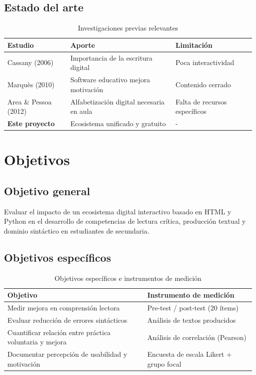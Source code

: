 \documentclass[12pt,spanish]{article}
\begin{document}
\subsection{Estado del arte}

\begin{table}[H]
\centering
\caption{Investigaciones previas relevantes}
\label{tab:estado_arte}
\begin{tabular}{|p{3.5cm}|p{5cm}|p{5cm}|}
\hline
\textbf{Estudio} & \textbf{Aporte} & \textbf{Limitación} \\
\hline
Cassany (2006) & Importancia de la escritura digital & Poca interactividad \\
\hline
Marquès (2010) & Software educativo mejora motivación & Contenido cerrado \\
\hline
Area \& Pessoa (2012) & Alfabetización digital necesaria en aula & Falta de recursos específicos \\
\hline
\textbf{Este proyecto} & Ecosistema unificado y gratuito & - \\
\hline
\end{tabular}
\end{table}

\newpage
\section{Objetivos}

\subsection{Objetivo general}

Evaluar el impacto de un ecosistema digital interactivo basado en HTML y Python en el desarrollo de competencias de lectura crítica, producción textual y dominio sintáctico en estudiantes de secundaria.

\subsection{Objetivos específicos}

\begin{table}[H]
\centering
\caption{Objetivos específicos e instrumentos de medición}
\label{tab:objetivos}
\begin{tabular}{|p{6cm}|p{7cm}|}
\hline
\textbf{Objetivo} & \textbf{Instrumento de medición} \\
\hline
Medir mejora en comprensión lectora & Pre-test / post-test (20 ítems) \\
\hline
Evaluar reducción de errores sintácticos & Análisis de textos producidos \\
\hline
Cuantificar relación entre práctica voluntaria y mejora & Análisis de correlación (Pearson) \\
\hline
Documentar percepción de usabilidad y motivación & Encuesta de escala Likert + grupo focal \\
\hline
\end{tabular}
\end{table}
\end{document}
